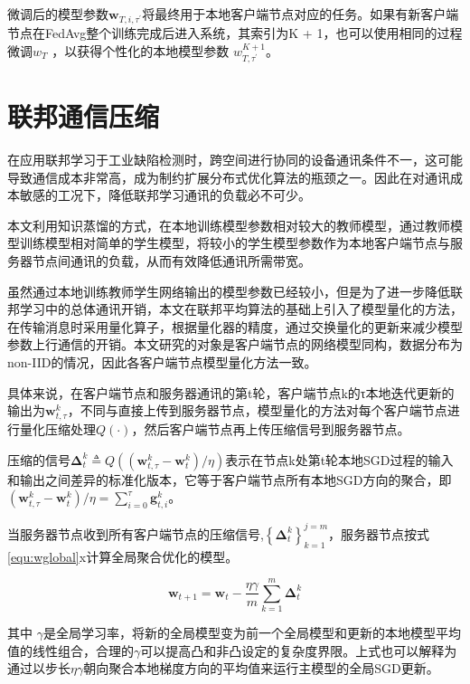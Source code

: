 微调后的模型参数$\boldsymbol{w}_{T, i, \tau^{\prime}}$将最终用于本地客户端节点对应的任务。如果有新客户端节点在FedAvg整个训练完成后进入系统，其索引为K + 1，也可以使用相同的过程微调$w_{T}$ ，以获得个性化的本地模型参数 ${w}^{K+1}_{T,\tau^{\prime}}$。

  

\section{联邦通信压缩}
在应用联邦学习于工业缺陷检测时，跨空间进行协同的设备通讯条件不一，这可能导致通信成本非常高，成为制约扩展分布式优化算法的瓶颈之一。因此在对通讯成本敏感的工况下，降低联邦学习通讯的负载必不可少。

本文利用知识蒸馏的方式，在本地训练模型参数相对较大的教师模型，通过教师模型训练模型相对简单的学生模型，将较小的学生模型参数作为本地客户端节点与服务器节点间通讯的负载，从而有效降低通讯所需带宽。

虽然通过本地训练教师学生网络输出的模型参数已经较小，但是为了进一步降低联邦学习中的总体通讯开销，本文在联邦平均算法的基础上引入了模型量化的方法，在传输消息时采用量化算子，根据量化器的精度，通过交换量化的更新来减少模型参数上行通信的开销。本文研究的对象是客户端节点的网络模型同构，数据分布为non-IID的情况，因此各客户端节点模型量化方法一致。

具体来说，在客户端节点和服务器通讯的第t轮，客户端节点k的τ本地迭代更新的输出为$\boldsymbol{w}_{t,\tau}^{k}$，不同与直接上传到服务器节点，模型量化的方法对每个客户端节点进行量化压缩处理$Q(\cdot)$，然后客户端节点再上传压缩信号到服务器节点。

压缩的信号$\boldsymbol{\Delta}_{t}^{k} \triangleq Q\left(\left(\boldsymbol{w}_{t,\tau}^{k}-\boldsymbol{w}_{t}^{k}\right) / \eta
\right)$表示在节点k处第t轮本地SGD过程的输入和输出之间差异的标准化版本，它等于客户端节点所有本地SGD方向的聚合，即$\left(\boldsymbol{w}_{t,\tau}^{k}-\boldsymbol{w}_{t}^{k}\right) / \eta =\sum_{i=0}^{\tau} \mathbf{g}_{t,i}^{k}$。

当服务器节点收到所有客户端节点的压缩信号,$\left\{\boldsymbol{\Delta}_{t }^{k}\right\}_{k=1}^{j=m}$，服务器节点按式\ref{equ:wglobal}x计算全局聚合优化的模型。

\begin{equation}\label{equ:wglobal}
  \boldsymbol{w}_{t+1}=\boldsymbol{w}_{t}-\frac{\eta \gamma}{m} \sum_{k=1}^{m} \boldsymbol{\Delta}_{t}^{k}
\end{equation}

其中 $\gamma$是全局学习率，将新的全局模型变为前一个全局模型和更新的本地模型平均值的线性组合，合理的$\gamma$可以提高凸和非凸设定的复杂度界限。上式也可以解释为通过以步长$\eta\gamma$朝向聚合本地梯度方向的平均值来运行主模型的全局SGD更新。\cite{haddadpourFederatedLearningCompression2021}

